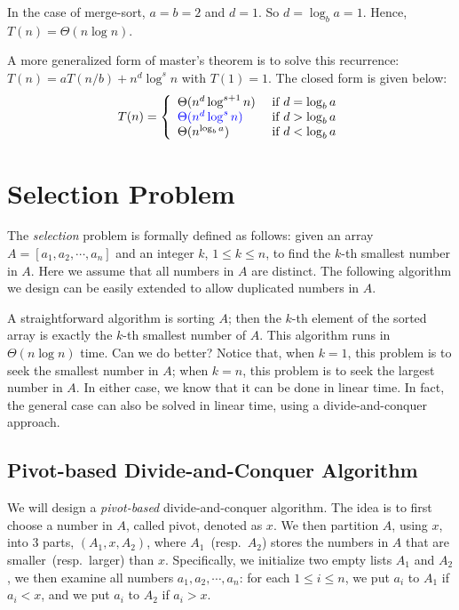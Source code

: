 In the case of merge-sort, $a = b = 2$ and $d = 1$. So $d = \log_b a = 1$.
Hence, $T(n) = \Theta(n\log n)$.

A more generalized form of master's theorem is to solve this recurrence:
$T(n) = aT(n/b) + n^d \log^s n$ with $T(1) = 1$. The closed form is given below: %
\begin{displaymath}
T(n) = \left\{
\begin{array}{llll}
\Theta(n^d \log^{s+1} n) & \textrm{ if } d = \log_b a \\
\textcolor{blue}{\Theta(n^d \log^s n)} & \textrm{ if } d > \log_b a \\
\Theta(n^{\log_b a}) & \textrm{ if } d < \log_b a \\
\end{array}
\right.
\end{displaymath}

\section*{Selection Problem}


The \emph{selection} problem is formally defined as follows: given an array $A = [a_1,a_2, \cdots, a_n]$ and
an integer $k$, $1 \le k \le n$, to find the $k$-th smallest number in $A$.
Here we assume that all numbers in $A$ are distinct. The following algorithm
we design can be easily extended to allow duplicated numbers in $A$.

A straightforward algorithm is sorting $A$; then the $k$-th element of the sorted array is exactly
the $k$-th smallest number of $A$. This algorithm runs in $\Theta(n\log n)$ time. Can we do better?
Notice that, when $k = 1$, this problem is to seek the smallest number in $A$;
when $k = n$, this problem is to seek the largest number in $A$.
In either case, we know that it can be done in linear time.
In fact, the general case can also be solved in linear time, using a divide-and-conquer approach.

\subsection*{Pivot-based Divide-and-Conquer Algorithm}

We will design a \emph{pivot-based} divide-and-conquer algorithm.
The idea is to first choose a number in $A$, called pivot, denoted as $x$.
We then partition $A$, using $x$, into 3 parts, $(A_1, x, A_2)$, where $A_1$~(resp.\ $A_2$) stores the numbers in $A$
that are smaller~(resp.\ larger) than $x$.
Specifically, we initialize two empty lists $A_1$ and $A_2$,
we then examine all numbers $a_1, a_2, \cdots, a_n$: for each $1\le i \le n$, we put $a_i$ to $A_1$ if $a_i < x$,
and we put $a_i$ to $A_2$ if $a_i > x$.

